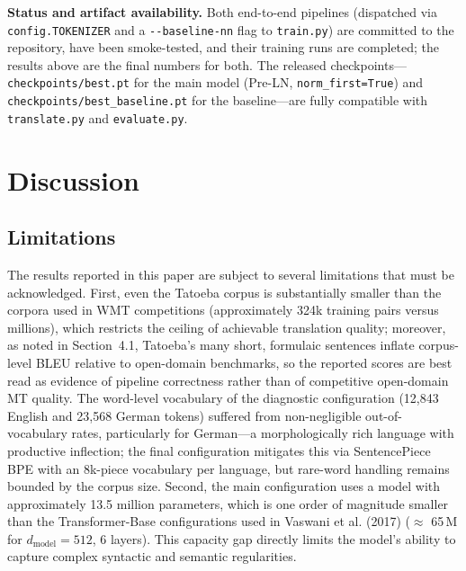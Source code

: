 \documentclass[10pt]{article}
\begin{document}
\textbf{Status and artifact availability.} Both end-to-end pipelines (dispatched via \texttt{config.TOKENIZER} and a \texttt{-{}-baseline-nn} flag to \texttt{train.py}) are committed to the repository, have been smoke-tested, and their training runs are completed; the results above are the final numbers for both. The released checkpoints---\texttt{checkpoints/best.pt} for the main model (Pre-LN, \texttt{norm\_first=True}) and \texttt{checkpoints/best\_baseline.pt} for the baseline---are fully compatible with \texttt{translate.py} and \texttt{evaluate.py}.

\section{Discussion}

\subsection{Limitations}

The results reported in this paper are subject to several limitations that must be acknowledged. First, even the Tatoeba corpus is substantially smaller than the corpora used in WMT competitions (approximately 324k training pairs versus millions), which restricts the ceiling of achievable translation quality; moreover, as noted in Section~4.1, Tatoeba's many short, formulaic sentences inflate corpus-level BLEU relative to open-domain benchmarks, so the reported scores are best read as evidence of pipeline correctness rather than of competitive open-domain MT quality. The word-level vocabulary of the diagnostic configuration (12,843 English and 23,568 German tokens) suffered from non-negligible out-of-vocabulary rates, particularly for German---a morphologically rich language with productive inflection; the final configuration mitigates this via SentencePiece BPE with an 8k-piece vocabulary per language, but rare-word handling remains bounded by the corpus size. Second, the main configuration uses a model with approximately 13.5 million parameters, which is one order of magnitude smaller than the Transformer-Base configurations used in Vaswani et al. (2017) ($\approx$ 65\,M for $d_{\text{model}}=512$, 6 layers). This capacity gap directly limits the model's ability to capture complex syntactic and semantic regularities.
\end{document}
